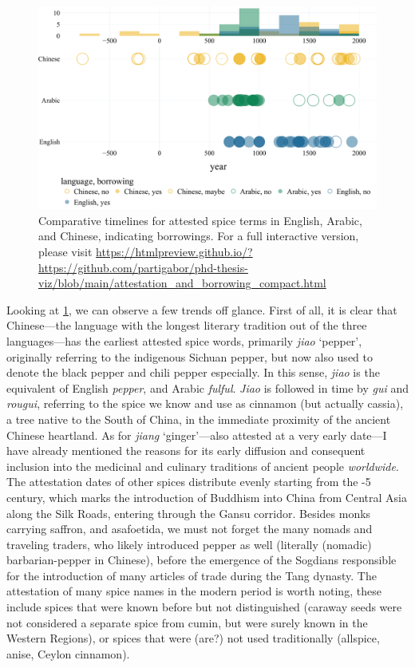 \begin{figure}[!ht]
  \centering
  \includegraphics[width=\linewidth]{imgs/plots/attestation_and_borrowing_compact.pdf}
  \caption[Comparative timelines for attested spice terms, indicating borrowings.]{Comparative timelines for attested spice terms in English, Arabic, and Chinese, indicating borrowings. For a full interactive version, please visit \url{https://htmlpreview.github.io/?https://github.com/partigabor/phd-thesis-viz/blob/main/attestation_and_borrowing_compact.html}}
  \label{fig:attestation_and_borrowing_compact}
\end{figure}

Looking at \cref{fig:attestation_and_borrowing_compact}, we can observe a few trends off glance. First of all, it is clear that Chinese---the language with the longest literary tradition out of the three languages---has the earliest attested spice words, primarily \textit{jiao} `pepper', originally referring to the indigenous Sichuan pepper, but now also used to denote the black pepper and chili pepper especially. In this sense, \textit{jiao} is the equivalent of English \textit{pepper}, and Arabic \textit{fulful}. \textit{Jiao} is followed in time by \textit{gui} and \textit{rougui}, referring to the spice we know and use as cinnamon (but actually cassia), a tree native to the South of China, in the immediate proximity of the ancient Chinese heartland. As for \textit{jiang} `ginger'---also attested at a very early date---I have already mentioned the reasons for its early diffusion and consequent inclusion into the medicinal and culinary traditions of ancient people \textit{worldwide}. The attestation dates of other spices distribute evenly starting from the -{5} century, which marks the introduction of Buddhism into China from Central Asia along the Silk Roads, entering through the Gansu corridor. Besides monks carrying saffron, and asafoetida, we must not forget the many nomads and traveling traders, who likely introduced pepper as well (literally (nomadic) barbarian-pepper in Chinese), before the emergence of the Sogdians responsible for the introduction of many articles of trade during the Tang dynasty. 
The attestation of many spice names in the modern period is worth noting, these include spices that were known before but not distinguished (caraway seeds were not considered a separate spice from cumin, but were surely known in the Western Regions), or spices that were (are?) not used traditionally (allspice, anise, Ceylon cinnamon).


